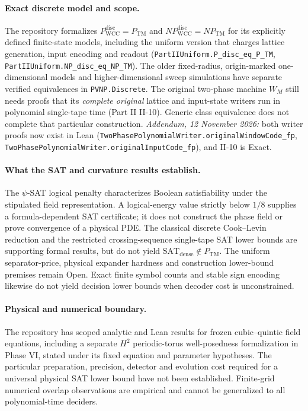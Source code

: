 \documentclass[12pt]{article}
\theoremstyle{remark}
\begin{document}
\paragraph{Exact discrete model and scope.}
The repository formalizes
$P_{\mathrm{WCC}}^{\mathrm{disc}}=P_{\mathrm{TM}}$
and $NP_{\mathrm{WCC}}^{\mathrm{disc}}=NP_{\mathrm{TM}}$
for its explicitly defined finite-state models,
including the uniform version that charges
lattice generation, input encoding and readout
(\nolinkurl{PartIIUniform.P_disc_eq_P_TM},
\nolinkurl{PartIIUniform.NP_disc_eq_NP_TM}).
The older fixed-radius, origin-marked
one-dimensional models and higher-dimensional
sweep simulations have separate verified
equivalences in \texttt{PVNP.Discrete}.
The original two-phase machine $W_M$ still
needs proofs that its \emph{complete original}
lattice and input-state writers run in
polynomial single-tape time (Part II II-10).
Generic class equivalence does not complete
that particular construction.
\emph{Addendum, 12 November 2026:} both writer
proofs now exist in Lean
(\nolinkurl{TwoPhasePolynomialWriter.originalWindowCode_fp},
\nolinkurl{TwoPhasePolynomialWriter.originalInputCode_fp}),
and II-10 is Exact.

\paragraph{What the SAT and curvature results establish.}
The $\psi$-SAT logical penalty
characterizes Boolean satisfiability under
the stipulated field representation.
A logical-energy value strictly below $1/8$
supplies a formula-dependent SAT certificate;
it does not construct the phase field or
prove convergence of a physical PDE.
The classical discrete Cook--Levin reduction
and the restricted crossing-sequence
single-tape SAT lower bounds are supporting
formal results, but do not yield
$\mathrm{SAT}_{\mathrm{dense}}\notin P_{\mathrm{TM}}$.
The uniform separator-price, physical
expander hardness and construction
lower-bound premises remain Open.
Exact finite symbol counts and stable sign
encoding likewise do not yield decision
lower bounds when decoder cost is unconstrained.

\paragraph{Physical and numerical boundary.}
The repository has scoped analytic and
Lean results for frozen cubic--quintic
field equations, including a separate
$H^2$ periodic-torus well-posedness
formalization in Phase VI, stated under
its fixed equation and parameter hypotheses.
The particular preparation, precision,
detector and evolution cost required for
a universal physical SAT lower bound
have not been established.  Finite-grid
numerical overlap observations are
empirical and cannot be generalized
to all polynomial-time deciders.
\end{document}
